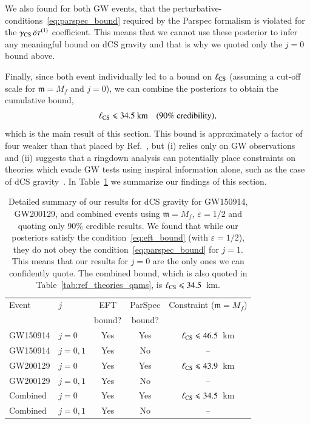 \documentclass[twocolumn,
               prd,
               aps,
               superscriptaddress,
               tightenlines,
               nofootinbib,
               eqsecnum,
               amsfonts,
               amsmath,
               longbibliography]{revtex4-1}
\newcommand{\gm}{\mathfrak{m}}
\begin{document}
We also found for both GW events, that the
perturbative-conditions~\eqref{eq:parspec_bound} required by the {\sc Parspec}
formalism is violated for the $\gamma_{\rm CS} \, \delta \tau^{(1)}$ coefficient.
%
This means that we cannot use these posterior to infer any meaningful bound on dCS gravity
and that is why we quoted only the $j=0$ bound above.

Finally, since both event individually led to a bound on $\ell_{\rm CS}$
(assuming a cut-off scale for $\gm = M_{f}$ and $j = 0$), we can combine the
posteriors to obtain the cumulative bound,
%
\begin{equation}
\ell_{\rm CS} \leqslant 34.5~\textrm{km}
\quad \textrm{(90\% credibility)},
\end{equation}
%
which is the main result of this section.
%
This bound is approximately a factor of four weaker than that placed by
Ref.~\cite{Silva:2020acr}, but
%
(i) relies only on GW observations and
%
(ii) suggests that a ringdown analysis can potentially place constraints on
theories which evade GW tests using inspiral information alone, such as the
case of dCS gravity~\cite{Nair:2019iur,Perkins:2021mhb,Lyu:2022gdr}.
%
In Table~\ref{tab:summary_dcs} we summarize our findings of this section.

\begin{table}[h]
\begin{tabular}{l l c c c}
\hline
\hline
Event & $j$ & EFT    & ParSpec & Constraint ($\gm = M_{f}$) \\
      &     & bound? & bound?  &                            \\
\hline
GW150914 & $j = 0$    & Yes & Yes & $\ell_{\rm CS} \leqslant 46.5$~km \\
GW150914 & $j = 0, 1$ & Yes & No  & --                                 \\
GW200129 & $j = 0$    & Yes & Yes & $\ell_{\rm CS} \leqslant 43.9$~km \\
GW200129 & $j = 0, 1$ & Yes & No  & --                                 \\
Combined & $j = 0$    & Yes & Yes & \cellcolor{blue!10}$\ell_{\rm CS} \leqslant 34.5$~km \\
Combined & $j = 0, 1$ & Yes & No  & --                                 \\
\hline
\hline
\end{tabular}
\caption{Detailed summary of our results for dCS gravity for GW150914, GW200129, and
combined events using $\gm = M_{f}$, $\varepsilon = 1/2$ and quoting only 90\% credible results.
%
We found that while our posteriors satisfy the condition~\eqref{eq:eft_bound} (with $\varepsilon = 1/2$),
they do not obey the condition~\eqref{eq:parspec_bound} for $j = 1$. This means
that our results for $j=0$ are the only ones we can confidently quote.
%
The combined bound, which is also quoted in Table~\ref{tab:ref_theories_qnms},
is $\ell_{\rm CS} \leqslant 34.5$~km.
}
\label{tab:summary_dcs}
\end{table}
\end{document}

